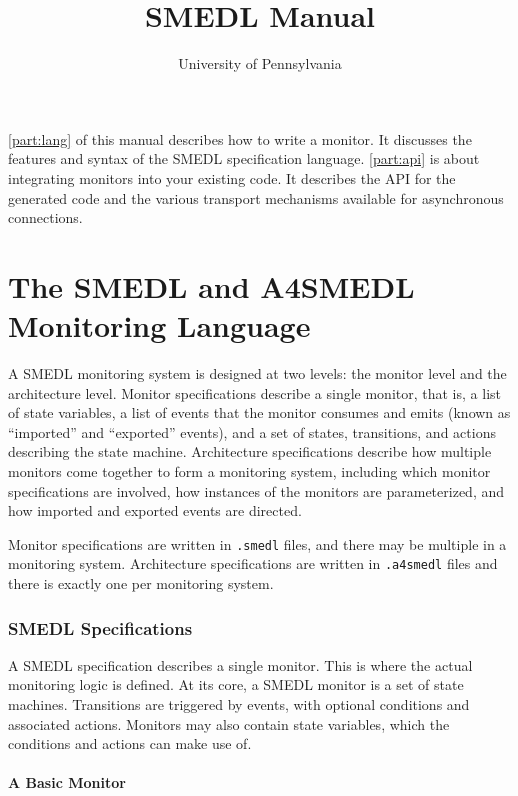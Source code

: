 \documentclass[paper=letter,titlepage,captions=tableheading]{scrartcl}
\title{SMEDL Manual}
\author{University of Pennsylvania}
\begin{document}
\maketitle


\autoref{part:lang} of this manual describes how to write a monitor. It discusses the features and syntax of the SMEDL specification language. \autoref{part:api} is about integrating monitors into your existing code. It describes the API for the generated code and the various transport mechanisms available for asynchronous connections.

\clearpage
\part{The SMEDL and A4SMEDL Monitoring Language}
\label{part:lang}

A SMEDL monitoring system is designed at two levels: the monitor level and
the architecture level. Monitor specifications describe a single monitor, that
is, a list of state variables, a list of events that the monitor consumes and
emits (known as ``imported'' and ``exported'' events), and a set of states,
transitions, and actions describing the state machine. Architecture
specifications describe how multiple monitors come together to form a
monitoring system, including which monitor specifications are involved, how
instances of the monitors are parameterized, and how imported and exported
events are directed.

Monitor specifications are written in \verb|.smedl| files, and there may be
multiple in a monitoring system. Architecture specifications are written in
\verb|.a4smedl| files and there is exactly one per monitoring system.

\section{SMEDL Specifications}
\label{sec:smedl}

A SMEDL specification describes a single monitor. This is where the actual
monitoring logic is defined. At its core, a SMEDL monitor is a set of state
machines. Transitions are triggered by events, with optional conditions and
associated actions. Monitors may also contain state variables, which the
conditions and actions can make use of.

\subsection{A Basic Monitor}
\label{subsec:smedl-basic}
\end{document}
